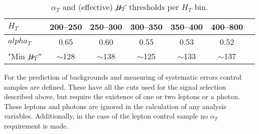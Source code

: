 \begin{table}[h!]
  \caption{$\alpha_T$ and (effective) $\cancel{H_T}$ thresholds per $H_T$ bin.\label{tab:alphat-thresholds}}
  \centering
  \footnotesize
  \begin{tabular}{ lcccccc }
    \hline
    \hline
    $H_T$     & 200--250   & 250--300   & 300--350  & 350--400  & 400--800 \\ %
    \hline                                                                     
    $alpha_T$      & 0.65       & 0.60       & 0.55      & 0.53      & 0.52     \\  %
    "Min $\cancel{H_T}$"   & $\sim$128  & $\sim$138  & $\sim$125 & $\sim$133 & $\sim$137 \\  %
    \hline
    \hline
  \end{tabular}
\end{table}

For the prediction of backgrounds and measuring of systematic errors control samples are defined. These have all the cuts used for the signal selection described above, but require the existence of one or two leptons or a photon. These leptons and photons are ignored in the calculation of any analysis variables. Additionally, in the case of the lepton control sample no $\alpha_T$ requirement is made.